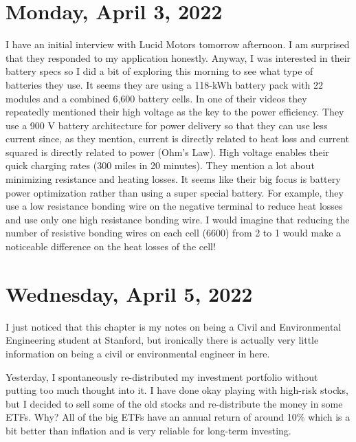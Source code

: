 \documentclass[12pt]{report}
\begin{document}
\section{Monday, April 3, 2022}

\par
I have an initial interview with Lucid Motors tomorrow afternoon. I am surprised that they responded to my application honestly. Anyway, I was interested in their battery specs so I did a bit of exploring this morning to see what type of batteries they use. It seems they are using a 118-kWh battery pack with 22 modules and a combined 6,600 battery cells. In one of their videos they repeatedly mentioned their high voltage as the key to the power efficiency. They use a 900 V battery architecture for power delivery so that they can use less current since, as they mention, current is directly related to heat loss and current squared is directly related to power (Ohm's Law). High voltage enables their quick charging rates (300 miles in 20 minutes). They mention a lot about minimizing resistance and heating losses. It seems like their big focus is battery power optimization rather than using a super special battery. For example, they use a low resistance bonding wire on the negative terminal to reduce heat losses and use only one high resistance bonding wire. I would imagine that reducing the number of resistive bonding wires on each cell (6600) from 2 to 1 would make a noticeable difference on the heat losses of the cell!

\section{Wednesday, April 5, 2022}

\par
I just noticed that this chapter is my notes on being a Civil and Environmental Engineering student at Stanford, but ironically there is actually very little information on being a civil or environmental engineer in here.

\par
Yesterday, I spontaneously re-distributed my investment portfolio without putting too much thought into it. I have done okay playing with high-risk stocks, but I decided to sell some of the old stocks and re-distribute the money in some ETFs. Why? All of the big ETFs have an annual return of around 10\% which is a bit better than inflation and is very reliable for long-term investing. 
\end{document}
